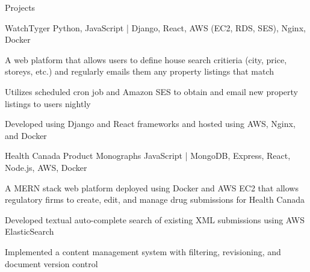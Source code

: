 \documentclass{resume} %
\begin{document}
	\vspace{-0.5em}
	\begin{rSection}{Projects}

		\begin{rProjectSection}
			{WatchTyger}
			{}
			{Python, JavaScript \textnormal{|} Django, React, AWS (EC2, RDS, SES), Nginx, Docker}
			{}
			{
				\item A web platform that allows users to define house search critieria (city, price, storeys, etc.) and regularly
				emails them any property listings that match
				\item Utilizes scheduled cron job and Amazon SES to obtain and email new property listings to users nightly
				\item Developed using Django and React frameworks and hosted using AWS, Nginx, and Docker
			}
		\end{rProjectSection}

		\begin{rProjectSection}
			{Health Canada Product Monographs}
			{}
			{JavaScript \textnormal{|} MongoDB, Express, React, Node.js, AWS, Docker}
			{}
			{
				\item A MERN stack web platform deployed using Docker and AWS EC2 that allows regulatory firms to create,
				edit, and manage drug submissions for Health Canada
				\item Developed textual auto-complete search of existing XML submissions using AWS ElasticSearch
				\item Implemented a content management system with filtering, revisioning, and document version control
			}
		\end{rProjectSection}



\end{rSection}
\end{document}
